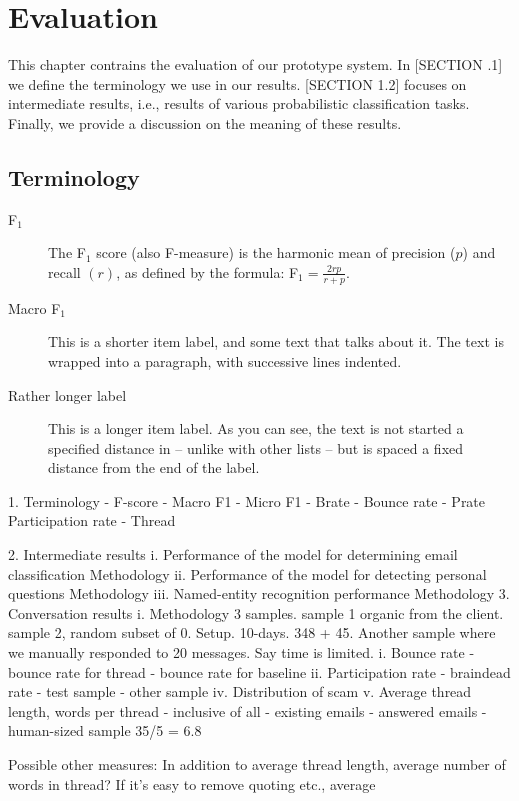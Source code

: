 \chapter{Evaluation}
This chapter contrains the evaluation of our prototype system. In [SECTION .1] we define the terminology we use in our results. [SECTION 1.2] focuses on intermediate results, i.e., results of various probabilistic classification tasks. Finally, we provide a discussion on the meaning of these results.

\section{Terminology}
\begin{description}
\item[F$_{1}$] The F$_{1}$ score (also F-measure) is the harmonic mean of precision ($p$) and recall $(r)$, as defined by the formula: F$_{1} = \frac{2rp}{r + p}$.
\item[Macro F$_{1}$] 
This is a shorter item label, and some text that talks about it.
The text is wrapped into a paragraph, with successive lines indented.
\item[Rather longer label] This is a longer item label.  As you can see, the
text is not started a specified distance in -- unlike with other lists -- but
is spaced a fixed distance from the end of the label.
\end{description}

	1. Terminology
		- F-score
		- Macro F1
		- Micro F1
		- Brate - Bounce rate 
		- Prate  Participation rate
		- Thread

	2. Intermediate results
		i. Performance of the model for determining email classification
			Methodology
		ii. Performance of the model for detecting personal questions
			Methodology
		iii. Named-entity recognition performance
			Methodology
	3. Conversation results
		i. Methodology 3 samples. sample 1 organic from the client. sample 2, random subset of 
		0. Setup. 10-days. 348 + 45. Another sample where we manually responded to 20 messages. Say time is limited.
		i. Bounce rate
			- bounce rate for thread
			- bounce rate for baseline
		ii. Participation rate
			- braindead rate
			- test sample
			- other sample
		iv. Distribution of scam
		v.  Average thread length, words per thread
			- inclusive of all
			- existing emails
			- answered emails
			- human-sized sample 35/5 = 6.8


Possible other measures: In addition to average thread length, average number of words in thread? If it's easy to remove quoting etc., average %






